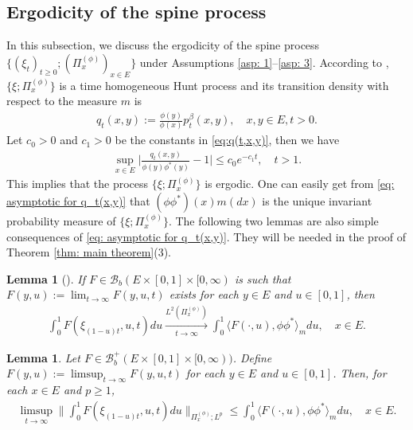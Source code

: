 \documentclass[12pt,a4paper]{amsart}
\newtheorem{lem}[thm]{Lemma}
\theoremstyle{definition}
\numberwithin{equation}{section}
\begin{document}
\subsection{Ergodicity of the spine process}
\label{sec: Ergodicity}
In this subsection, we discuss the ergodicity of the spine process $\{(\xi_t)_{t\geq 0}; (\Pi^{(\phi)}_x)_{x\in E}\}$ under Assumptions \ref{asp: 1}--\ref{asp: 3}.
According to \cite{KimSong2008Intrinsic}, $\{\xi; \Pi^{(\phi)}_x\}$ is a time homogeneous Hunt process and its transition density with respect to the measure $m$ is
\begin{align}
	q_t(x,y) := \frac{\phi(y)}{\phi(x)} p^\beta_t(x,y),
	\quad x,y\in E, t>0.
\end{align}
Let $c_0>0$ and $c_1>0$ be the constants  in \eqref{eq:q(t,x,y)}, then we have
\begin{align}\label{eq: asymptotic for q_t(x,y)}
	\sup_{x\in E} \Big| \frac{q_t(x,y)}{\phi(y)\phi^*(y)} - 1\Big|
	\leq c_0 e^{-c_1 t},
	\quad t > 1.
\end{align}
This implies that the process $\{\xi; \Pi^{(\phi)}_x\}$ is ergodic.
One can easily get from \eqref{eq: asymptotic for q_t(x,y)} that $(\phi\phi^*)(x)m(dx)$ is the unique invariant probability measure of $\{\xi; \Pi^{(\phi)}_x\}$.
The following two lemmas are also simple consequences of \eqref{eq: asymptotic for q_t(x,y)}.
They will be needed in the proof of  Theorem \ref{thm: main theorem}(3).
\begin{lem}[{\cite[Lemma 5.6]{RenSongSun2017Spine}}] \label{lem: ergodicity of the underlying process}
If $F\in \mathscr B_b(E\times [0,1]\times [0,\infty)$ is
such that $F(y,u):= \lim_{t\to \infty} F(y,u,t)$ exists for each $y\in E$ and $u \in [0,1]$, then
\begin{align}
	\int_0^1 F(\xi_{(1-u)t},u,t) du
	\xrightarrow[t\to \infty]{ L^2(\Pi_x^{(\phi)})}
	\int_0^1 \langle F(\cdot , u), \phi\phi^*\rangle_m du,
	\quad x\in E.
\end{align}
\end{lem}
\begin{lem}\label{lem: Fatou-ergodic lemma for the uderlying process}
Let $F\in \mathscr B^+_b(E\times [0,1]\times [0,\infty))$.
	Define $F(y,u):= \limsup_{t\to \infty} F(y,u,t)$ for each $y\in E$ and $u \in [0,1]$.
	Then, for each $x\in E$ and $p \geq 1$,
\begin{align}
	\limsup_{ t \to \infty}  \Big\| \int_0^1 F(\xi_{(1-u) t },u,t) du  \Big\|_{\Pi_x^{(\phi)};L^p}
	\leq \int_0^1 \langle F(\cdot, u), \phi \phi^*\rangle_m du,
	\quad x\in E.
\end{align}
\end{lem}
\end{document}
